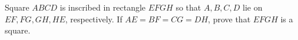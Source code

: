 Square $ABCD$ is inscribed in rectangle $EFGH$ so that $A,B,C,D$ lie on $EF,FG,GH,HE$, respectively. If $AE=BF=CG=DH$, prove that $EFGH$ is a square.
